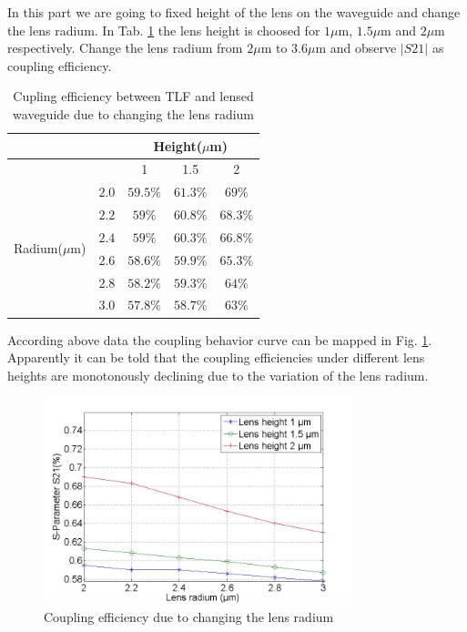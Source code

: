 In this part we are going to fixed height of the lens on the waveguide and change the lens radium.
In Tab. \ref{tab:coupling_lensed_waveguide_radium} the lens height is choosed for $1\mu$m, $1.5\mu$m and $2\mu$m respectively. Change the lens radium from $2\mu$m to $3.6\mu$m and observe $|S21|$ as coupling efficiency.

\begin{table}
\caption{Cupling efficiency between TLF and lensed waveguide due to changing the lens radium}
\centering
\begin{tabular}{|c|c|c|c|c|}
\hline
\multicolumn{2}{|c}{}&\multicolumn{3}{c|}{Height($\mu$m)}\\
\hline
\multicolumn{2}{|c|}{}&	1&	1.5&2\\
\hline
\multirow{6}{*}{Radium($\mu$m)}&$2.0$& $59.5\%$	&$61.3\%$	&$69\%$\\
&$2.2$& $59\%$		&$60.8\%$	&$68.3\%$\\
&$2.4$&$59\%$		&$60.3\%$	&$66.8\%$\\
&$2.6$&$58.6\%$	&$59.9\%$	&$65.3\%$\\
&$2.8$&$58.2\%$	&$59.3\%$	&$64\%$\\
&$3.0$&$57.8\%$	&$58.7\%$	&$63\%$\\
\hline
\end{tabular}
\label{tab:coupling_lensed_waveguide_radium}
\end{table}

According above data the coupling behavior curve can be mapped in Fig. \ref{fig:coupling_lenses_curve_rxx}. Apparently it can be told that the coupling efficiencies under different lens heights are monotonously declining due to the variation of the lens radium.
\begin{figure}[!ht]
\centering
\includegraphics[width=0.8\textwidth]{bilder/s21_fix_lens_height_rxx}
\caption{Coupling efficiency due to changing the lens radium}
\label{fig:coupling_lenses_curve_rxx}
\end{figure}

